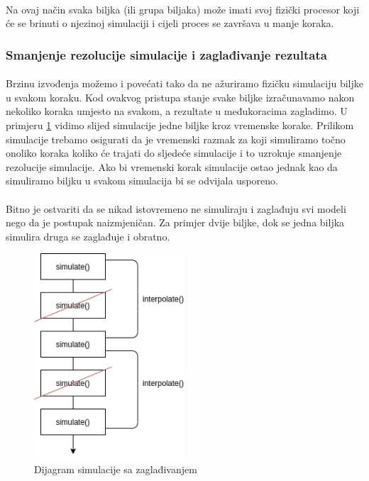 \documentclass[times, utf8, diplomski]{fer}
\begin{document}
\paragraph{}
Na ovaj način svaka biljka (ili grupa biljaka) može imati svoj fizički procesor 
koji će se brinuti o njezinoj simulaciji i cijeli proces se završava u manje 
koraka.

\subsubsection{Smanjenje rezolucije simulacije i zaglađivanje rezultata}
\paragraph{}
Brzinu izvođenja možemo i povećati tako da ne ažuriramo fizičku simulaciju 
biljke u svakom koraku. Kod ovakvog pristupa stanje svake biljke izračunavamo 
nakon nekoliko koraka umjesto na svakom, a rezultate u međukoracima zagladimo.
U primjeru \ref{fig:531-2} vidimo slijed simulacije jedne biljke kroz vremenske 
korake. Prilikom simulacije trebamo osigurati da je vremenski razmak za koji 
simuliramo točno onoliko koraka koliko će trajati do sljedeće simulacije i to 
uzrokuje smanjenje rezolucije simulacije. Ako bi vremenski korak simulacije 
ostao jednak kao da simuliramo biljku u svakom simulacija bi se odvijala 
usporeno.
\paragraph{}
Bitno je ostvariti da se nikad istovremeno ne simuliraju i zaglađuju svi modeli 
nego da je postupak naizmjeničan. Za primjer dvije biljke, dok se jedna 
biljka simulira druga se zaglađuje i obratno.
\begin{figure}[h]
	\centering
	\includegraphics[width=0.5\textwidth]{img/531-2}
	\caption{Dijagram simulacije sa zaglađivanjem}
	\label{fig:531-2}
\end{figure}
\end{document}
